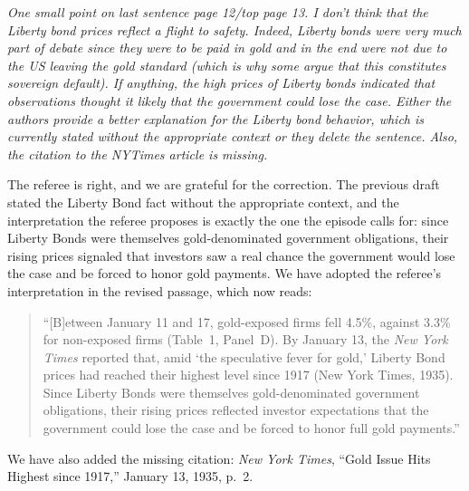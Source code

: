 \noindent \textit{\textcolor{red!60!black}{
One small point on last sentence page 12/top page 13. I don't think that the Liberty bond prices reflect a flight to safety. Indeed, Liberty bonds were very much part of debate since they were to be paid in gold and in the end were not due to the US leaving the gold standard (which is why some argue that this constitutes sovereign default). If anything, the high prices of Liberty bonds indicated that observations thought it likely that the government could lose the case. Either the authors provide a better explanation for the Liberty bond behavior, which is currently stated without the appropriate context or they delete the sentence. Also, the citation to the NYTimes article is missing.
}}

\bigskip

\noindent The referee is right, and we are grateful for the correction. The previous draft stated the Liberty Bond fact without the appropriate context, and the interpretation the referee proposes is exactly the one the episode calls for: since Liberty Bonds were themselves gold-denominated government obligations, their rising prices signaled that investors saw a real chance the government would lose the case and be forced to honor gold payments. We have adopted the referee's interpretation in the revised passage, which now reads:

\begin{quote}
``[B]etween January 11 and 17, gold-exposed firms fell 4.5\%, against 3.3\% for non-exposed firms (Table~1, Panel~D). By January 13, the \textit{New York Times} reported that, amid `the speculative fever for gold,' Liberty Bond prices had reached their highest level since 1917 (New York Times, 1935). Since Liberty Bonds were themselves gold-denominated government obligations, their rising prices reflected investor expectations that the government could lose the case and be forced to honor full gold payments.''
\end{quote}

We have also added the missing citation: \textit{New York Times}, ``Gold Issue Hits Highest since 1917,'' January 13, 1935, p.\ 2.
